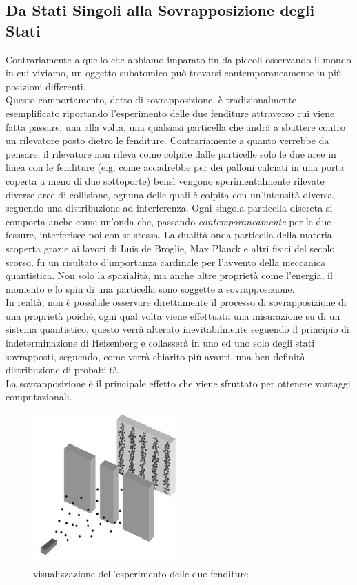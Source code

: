 \documentclass[12pt,a4paper,openright]{report}
\begin{document}
\subsection{Da Stati Singoli alla Sovrapposizione degli Stati}
  Contrariamente a quello che abbiamo imparato fin da piccoli osservando il mondo in cui viviamo, un oggetto subatomico può trovarsi contemporaneamente in più posizioni differenti.\\
  Questo comportamento, detto di sovrapposizione, è tradizionalmente esemplificato riportando l'esperimento \cite{ref13} delle due fenditure attraverso cui viene 
  fatta passare, una alla volta, una qualsiasi particella che andrà a sbattere contro un rilevatore posto dietro le fenditure. Contrariamente a quanto verrebbe da pensare,
  il rilevatore non rileva come colpite dalle particelle solo le due aree in linea con le fenditure (e.g. come accadrebbe per dei palloni calciati in una porta coperta a meno di due sottoporte) bensì vengono 
  sperimentalmente rilevate diverse aree di collisione, ognuna delle quali è colpita con un'intensità diversa, seguendo una distribuzione ad interferenza.
  Ogni singola particella discreta si comporta anche come un'onda che, passando \emph{contemporaneamente} per le due fessure, interferisce poi con se stessa.
  La dualità onda particella della materia scoperta grazie ai lavori di Luis de Broglie, Max Planck e altri fisici del secolo scorso, fu un risultato d'importanza cardinale per l'avvento della meccanica quantistica.
  Non solo la spazialità, ma anche altre proprietà come l'energia, il momento e lo spin di una particella sono soggette a sovrapposizione.\\
  In realtà, non è possibile osservare direttamente il processo di sovrapposizione di una proprietà poichè, ogni qual volta viene effettuata una misurazione su di un
  sistema quantistico, questo verrà alterato inevitabilmente seguendo il principio di indeterminazione di Heisenberg e collasserà in uno ed uno solo degli stati sovrapposti, seguendo, come verrà chiarito più avanti, una ben definità distribuzione di probabiltà.\\
  La sovrapposizione è il principale effetto che viene sfruttato per ottenere vantaggi computazionali. 
\begin{figure}[h]
    \centering
    \includegraphics[width=0.5\textwidth]{double-slit-electrons1}
    \caption{visualizzazione dell'esperimento delle due fenditure}
\end{figure}
  
\end{document}
